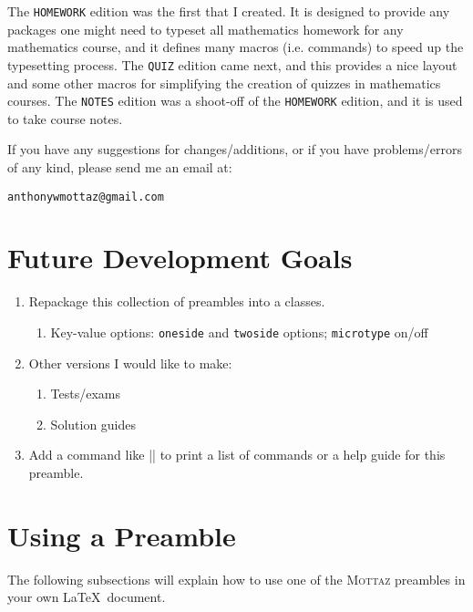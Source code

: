 \documentclass[letterpaper]{ltxdoc}
\begin{document}
The \texttt{HOMEWORK} edition was the first that I created. It is designed to 
provide any packages one might need to typeset all mathematics homework for any 
mathematics course, and it defines many macros (i.e. commands) to speed up the 
typesetting process. The \texttt{QUIZ} edition came next, and this provides a 
nice layout and some other macros for simplifying the creation of quizzes in 
mathematics courses. The \texttt{NOTES} edition was a shoot-off of the 
\texttt{HOMEWORK} edition, and it is used to take course notes.

If you have any suggestions for changes/additions, or if you have 
problems/errors of any kind, please send me an email at:
\begin{center}
\texttt{anthonywmottaz@gmail.com}
\end{center}
\section{Future Development Goals}
\begin{enumerate}[\bfseries I.]
\item Repackage this collection of preambles into a classes.
\begin{enumerate}[\bfseries i.]
    \item Key-value options: \texttt{oneside} and \texttt{twoside} options; 
    \texttt{microtype} on/off
\end{enumerate}
\item Other versions I would like to make:
\begin{enumerate}[\bfseries i.]
    \item Tests/exams
    \item Solution guides
\end{enumerate}
\item Add a command like |\layout| to print a list of commands or a help guide 
for this preamble.
\end{enumerate}
\section{Using a Preamble}
\label{sec:usepream}
The following subsections will explain how to use one of the \textsc{Mottaz} 
preambles in your own \LaTeX\ document.
\end{document}
